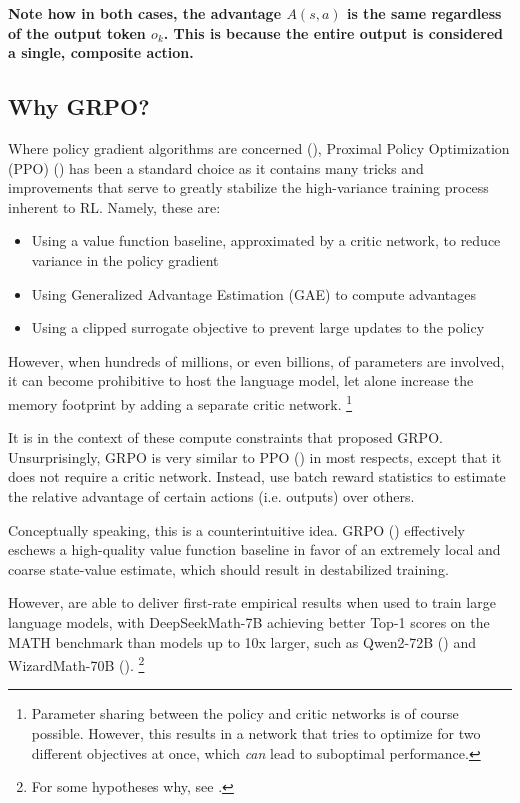 \documentclass{article} %
\theoremstyle{definition}
\begin{document}
\textbf{
    Note how in both cases, the advantage $A(s, a)$ is the same regardless of the output token $o_k$. This is 
    because the entire output is considered a single, composite action.
}

\subsection{Why GRPO?}

Where policy gradient algorithms are concerned (\cite{Weng-2018}), Proximal Policy Optimization (PPO) (\cite{ppo}) 
has been a standard choice as it contains many tricks and improvements
that serve to greatly stabilize the high-variance training process inherent to RL.
Namely, these are:
\begin{itemize}
    \item Using a value function baseline, approximated by a critic network, to reduce variance in the policy gradient
    \item Using Generalized Advantage Estimation (GAE) to compute advantages
    \item Using a clipped surrogate objective to prevent large updates to the policy
\end{itemize}

However, when hundreds of millions, or even billions, of parameters are involved,
it can become prohibitive to host the language model, let alone increase the memory footprint
by adding a separate critic network. \footnote{
    Parameter sharing between the policy and critic networks is of course possible.
    However, this results in a network that tries to optimize for two different objectives at once,
    which \textit{can} lead to suboptimal performance.
}

It is in the context of these compute constraints that \cite{grpo} proposed GRPO.
Unsurprisingly, GRPO is very similar to PPO (\cite{ppo}) in most respects, except that it does not require a critic network.
Instead, \cite{grpo} use batch reward statistics to estimate the relative advantage of certain actions (i.e. outputs) over others.

Conceptually speaking, this is a counterintuitive idea. GRPO (\cite{grpo}) effectively eschews a high-quality value function baseline 
in favor of an extremely local and coarse state-value estimate, which should result in destabilized training.

However, \cite{grpo} are able to deliver first-rate empirical results when used to 
train large language models, with DeepSeekMath-7B achieving better Top-1 scores on 
the MATH benchmark than models up to 10x larger, such as Qwen2-72B (\cite{Qwen2}) and WizardMath-70B (\cite{wizardmath}). \footnote{
    For some hypotheses why, see \cite{beh-2025}.
}
\end{document}
